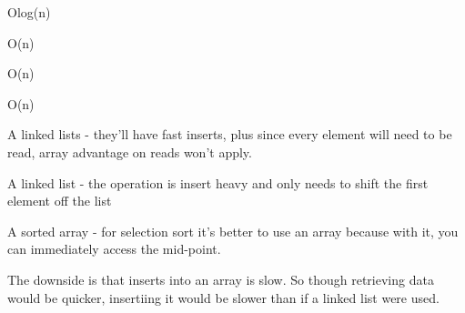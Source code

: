 \begin{problem}{1.3}
\end{problem}
\begin{solution}
Olog(n)
\end{solution}

\begin{problem}{1.4}
\end{problem}
\begin{solution}
O(n)
\end{solution}

\begin{problem}{1.5}
\end{problem}
\begin{solution}
O(n)
\end{solution}

\begin{problem}{1.6}
\end{problem}
\begin{solution}
O(n)
\end{solution}

\begin{problem}{2.1}
\end{problem}
\begin{solution}
A linked lists - they'll have fast inserts, plus since every element will need to be read, array advantage on reads won't apply.
\end{solution}

\begin{problem}{2.2}
\end{problem}
\begin{solution}
A linked list - the operation is insert heavy and only needs to shift the first element off the list
\end{solution}

\begin{problem}{2.3}
\end{problem}
\begin{solution}
A sorted array - for selection sort it's better to use an array because with it, you can immediately access the mid-point.
\end{solution}

\begin{problem}{2.4}
\end{problem}
\begin{solution}
The downside is that inserts into an array is slow. So though retrieving data would be quicker, insertiing it would be slower than if a linked list were used.
\end{solution}

